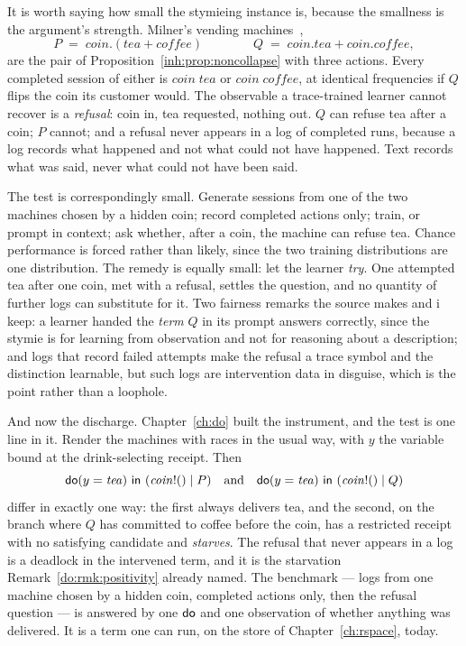 It is worth saying how small the stymieing instance is, because the
smallness is the argument's strength.
Milner's vending machines~\cite{milnerCC},
\[
P \;=\; \mathit{coin}.(\mathit{tea} + \mathit{coffee})
\qquad\qquad
Q \;=\; \mathit{coin}.\mathit{tea} + \mathit{coin}.\mathit{coffee},
\]
are the pair of Proposition~\ref{inh:prop:noncollapse} with three
actions.
Every completed session of either is $\mathit{coin}\;\mathit{tea}$ or
$\mathit{coin}\;\mathit{coffee}$, at identical frequencies if $Q$ flips
the coin its customer would.
The observable a trace-trained learner cannot recover is a
\emph{refusal}: coin in, tea requested, nothing out.
$Q$ can refuse tea after a coin; $P$ cannot; and a refusal never appears
in a log of completed runs, because a log records what happened and not
what could not have happened.
Text records what was said, never what could not have been said.

The test is correspondingly small.
Generate sessions from one of the two machines chosen by a hidden coin;
record completed actions only; train, or prompt in context; ask whether,
after a coin, the machine can refuse tea.
Chance performance is forced rather than likely, since the two training
distributions are one distribution.
The remedy is equally small: let the learner \emph{try}.
One attempted tea after one coin, met with a refusal, settles the
question, and no quantity of further logs can substitute for it.
Two fairness remarks the source makes and i keep: a learner handed the
\emph{term} $Q$ in its prompt answers correctly, since the stymie is for
learning from observation and not for reasoning about a description;
and logs that record failed attempts make the refusal a trace symbol and
the distinction learnable, but such logs are intervention data in
disguise, which is the point rather than a loophole.

And now the discharge.
Chapter~\ref{ch:do} built the instrument, and the test is one line in
it.
Render the machines with races in the usual way, with $y$ the variable
bound at the drink-selecting receipt.
Then
\[
  \textsf{do}(y = \mathit{tea})\ \textsf{in}\ (\mathit{coin}!() \mid P)
  \quad\text{and}\quad
  \textsf{do}(y = \mathit{tea})\ \textsf{in}\ (\mathit{coin}!() \mid Q)
\]
differ in exactly one way: the first always delivers tea, and the second,
on the branch where $Q$ has committed to coffee before the coin, has a
restricted receipt with no satisfying candidate and \emph{starves}.
The refusal that never appears in a log is a deadlock in the intervened
term, and it is the starvation Remark~\ref{do:rmk:positivity} already
named.
The benchmark --- logs from one machine chosen by a hidden coin, completed
actions only, then the refusal question --- is answered by one $\textsf{do}$ and
one observation of whether anything was delivered.
It is a term one can run, on the store of Chapter~\ref{ch:rspace}, today.

